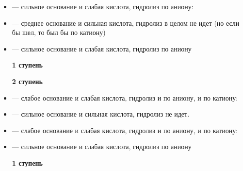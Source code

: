 \documentclass[a4paper, 12pt]{article}
\begin{document}
\begin{itemize}
	\item {} --- сильное основание и слабая кислота, гидролиз по аниону:
	
	
	
	\item {} --- среднее основание и сильная кислота, гидролиз в целом не идет (но если бы шел, то был бы по катиону)
	
	
	\item {} --- сильное основание и слабая кислота, гидролиз по аниону
	
	\textbf{1 ступень}
	
	
	
	\textbf{2 ступень}
	
	
	
	\item {} --- слабое основание и слабая кислота, гидролиз и по аниону, и по катиону:
	
	
	
	\item {} --- сильное основание и сильная кислота, гидролиз не идет.
	
	\item {} --- слабое основание и слабая кислота, гидролиз и по аниону, и по катиону:
	
	
	
	\item {} --- сильное основание и слабая кислота, гидролиз по аниону
	
	\textbf{1 ступень}
	
	
	

\end{itemize}
\end{document}
